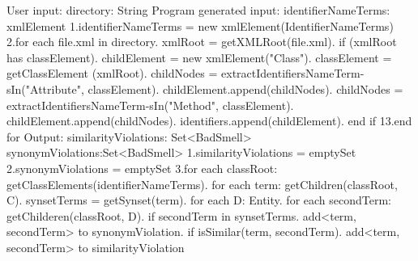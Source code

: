 \begin{enumerate}
\begin{framed}
  {\selectfont  
User input:\newline
 directory: String
 Program generated input:\newline
 identifierNameTerms: xmlElement\newline
 1.identifierNameTerms = new xmlElement(IdentifierNameTerms)\newline
 2.for each file.xml in directory.	xmlRoot = getXMLRoot(file.xml).	if (xmlRoot has classElement).		childElement = new xmlElement("Class").             classElement = getClassElement (xmlRoot).		childNodes = extractIdentifiersNameTerm-sIn("Attribute", classElement).		childElement.append(childNodes).             childNodes = extractIdentifiersNameTerm-sIn("Method", classElement).		childElement.append(childNodes).		identifiers.append(childElement).	end if \newline
 13.end for\newline
 Output:\newline
 similarityViolations: Set<BadSmell>\newline
 synonymViolations:Set<BadSmell>\newline
 1.similarityViolations = emptySet\newline
 2.synonymViolations = emptySet\newline
 3.for each classRoot: getClassElements(identifierNameTerms).   for each term: getChildren(classRoot, C).	synsetTerms = getSynset(term).	for each D: Entity.		for each secondTerm: getChilderen(classRoot, D).			if secondTerm in synsetTerms.				add<term, secondTerm> to synonymViolation.			if isSimilar(term, secondTerm).				add<term, secondTerm> to similarityViolation\newline
}
\end{framed}
\end{enumerate}
